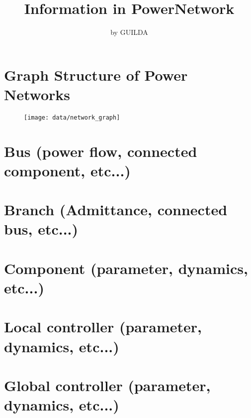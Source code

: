 \documentclass{article}
\title{Information in PowerNetwork}
\author{by GUILDA}
\begin{document}
\maketitle{}

\section{Graph Structure of Power Networks}

 \begin{figure}[H]
 \begin{center}
 \texttt{[image: data/network\_graph]}
 \end{center}
 \end{figure}


\section{Bus (power flow, connected component, etc...)}


\section{Branch (Admittance, connected bus, etc...)}


\section{Component (parameter, dynamics, etc...)}


\section{Local controller (parameter, dynamics, etc...)}


\section{Global controller (parameter, dynamics, etc...)}

\end{document}
